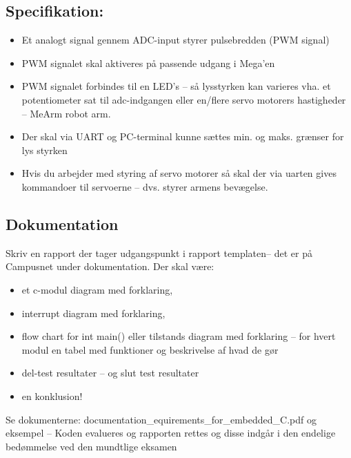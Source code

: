 \documentclass[a4paper,11pt]{article}
\theoremstyle{mytheor}
\newtheorem{defi}{Definition}
\begin{document}
\subsection{Specifikation:}
\begin{itemize}
\item Et analogt signal gennem ADC-input styrer pulsebredden (PWM signal)
\item PWM signalet skal aktiveres på passende udgang i Mega’en
\item PWM signalet forbindes til en LED’s – så lysstyrken kan varieres vha. et potentiometer sat til adc-indgangen eller en/flere servo motorers hastigheder – MeArm robot arm.
\item Der skal via UART og PC-terminal kunne sættes min. og maks. grænser for lys styrken
\item Hvis du arbejder med styring af servo motorer så skal der via uarten gives kommandoer til servoerne – dvs. styrer armens bevægelse.
\end{itemize}


\subsection{Dokumentation}

Skriv en rapport der tager udgangspunkt i rapport templaten– det er på Campusnet under dokumentation. Der skal være:
\begin{itemize}
\item et c-modul diagram med forklaring,
\item interrupt diagram med forklaring,
\item flow chart for int main() eller tilstands diagram med forklaring –
for hvert modul en tabel med funktioner og beskrivelse af hvad de gør
\item del-test resultater – og slut test resultater
\item en konklusion!
\end{itemize}
Se dokumenterne: documentation\_equirements\_for\_embedded\_C.pdf og eksempel
– Koden evalueres og rapporten rettes og disse indgår i den endelige bedømmelse ved den mundtlige eksamen
\end{document}
